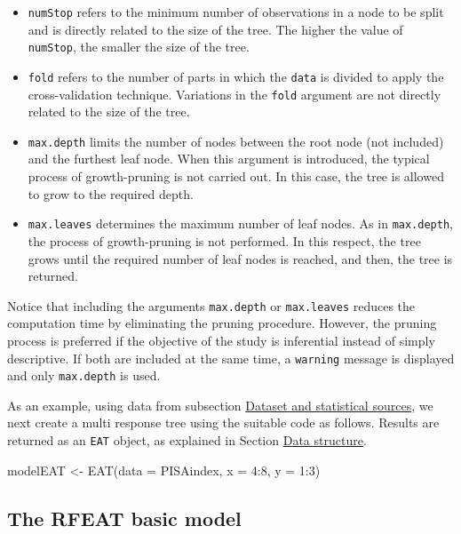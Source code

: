 \begin{itemize}
\item
  \texttt{numStop} refers to the minimum number of observations in a
  node to be split and is directly related to the size of the tree. The
  higher the value of \texttt{numStop}, the smaller the size of the
  tree.
\item
  \texttt{fold} refers to the number of parts in which the \texttt{data}
  is divided to apply the cross-validation technique. Variations in the
  \texttt{fold} argument are not directly related to the size of the
  tree.
\item
  \texttt{max.depth} limits the number of nodes between the root node
  (not included) and the furthest leaf node. When this argument is
  introduced, the typical process of growth-pruning is not carried out.
  In this case, the tree is allowed to grow to the required depth.
\item
  \texttt{max.leaves} determines the maximum number of leaf nodes. As in
  \texttt{max.depth}, the process of growth-pruning is not performed. In
  this respect, the tree grows until the required number of leaf nodes
  is reached, and then, the tree is returned.
\end{itemize}

Notice that including the arguments \texttt{max.depth} or
\texttt{max.leaves} reduces the computation time by eliminating the
pruning procedure. However, the pruning process is preferred if the
objective of the study is inferential instead of simply descriptive. If
both are included at the same time, a \texttt{warning} message is
displayed and only \texttt{max.depth} is used.

As an example, using data from subsection
\protect\hyperlink{section3.1}{Dataset and statistical sources}, we next
create a multi response tree using the suitable code as follows. Results
are returned as an \texttt{EAT} object, as explained in Section
\protect\hyperlink{section3}{Data structure}.

\begin{Schunk}
\begin{Sinput}
modelEAT <- EAT(data = PISAindex, x = 4:8, y = 1:3)
\end{Sinput}
\end{Schunk}

\hypertarget{the-rfeat-basic-model}{%
\subsection{The RFEAT basic model}\label{the-rfeat-basic-model}}

